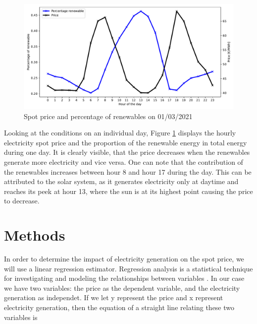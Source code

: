 \documentclass{article}
\begin{document}


\begin{figure}[h]
    \centering
    \includegraphics[width=0.8\columnwidth]{doc/fig/example_day.pdf}
    \caption{Spot price and percentage of renewables on 01/03/2021}
    \label{fig:example_day}
\end{figure}

Looking at the conditions on an individual day, Figure \ref{fig:example_day} displays the hourly electricity spot price and the proportion of the renewable energy in total energy during one day. 
It is clearly visible, that the price decreases when the renewables generate more electricity and vice versa. 
One can note that the contribution of the renewables increases between hour 8 and hour 17 during the day. 
This can be attributed to the solar system, as it generates electricity only at daytime and reaches its peek at hour 13, where the sun is at its highest point causing the price to decrease. 

\section{Methods}

In order to determine the impact of electricity generation on the spot price, we will use a linear regression estimator. 
Regression analysis is a statistical technique for investigating and modeling the relationships between variables \citep{montgomery2021introduction}. 
In our case we have two variables: the price as the dependent variable, and the electricity generation as independet.
If we let y represent the price and x represent electricity generation, then the equation of a straight line relating these two variables is 
\end{document}

